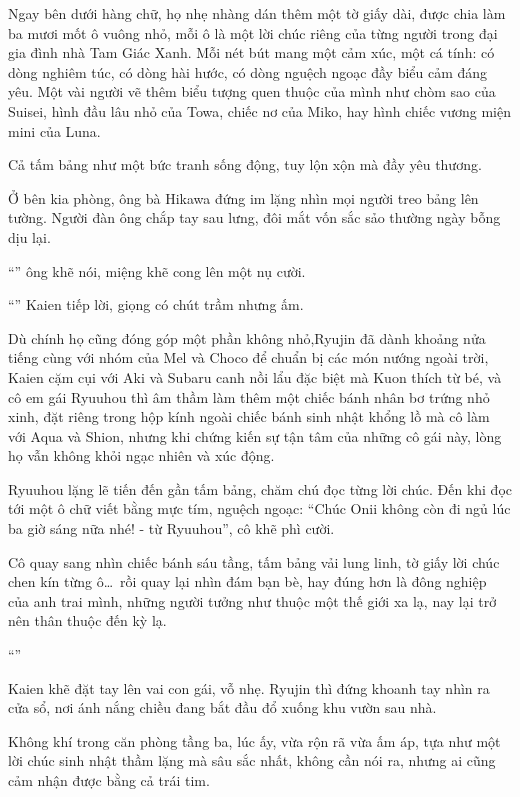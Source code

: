 \documentclass[../main.tex]{subfiles}
\begin{document}
Ngay bên dưới hàng chữ, họ nhẹ nhàng dán thêm một tờ giấy dài, được chia làm ba mươi mốt ô vuông nhỏ, mỗi ô là một lời chúc riêng của từng người trong đại gia đình nhà Tam Giác Xanh. Mỗi nét bút mang một cảm xúc, một cá tính: có dòng nghiêm túc, có dòng hài hước, có dòng nguệch ngoạc đầy biểu cảm đáng yêu. Một vài người vẽ thêm biểu tượng quen thuộc của mình như chòm sao của Suisei, hình đầu lâu nhỏ của Towa, chiếc nơ của Miko, hay hình chiếc vương miện mini của Luna.

Cả tấm bảng như một bức tranh sống động, tuy lộn xộn mà đầy yêu thương.

Ở bên kia phòng, ông bà Hikawa đứng im lặng nhìn mọi người treo bảng lên tường. Người đàn ông chắp tay sau lưng, đôi mắt vốn sắc sảo thường ngày bỗng dịu lại.

``'' ông khẽ nói, miệng khẽ cong lên một nụ cười.

``'' Kaien tiếp lời, giọng có chút trầm nhưng ấm.

Dù chính họ cũng đóng góp một phần không nhỏ,Ryujin đã dành khoảng nửa tiếng cùng với nhóm của Mel và Choco để chuẩn bị các món nướng ngoài trời, Kaien cặm cụi với Aki và Subaru canh nồi lẩu đặc biệt mà Kuon thích từ bé, và cô em gái Ryuuhou thì âm thầm làm thêm một chiếc bánh nhân bơ trứng nhỏ xinh, đặt riêng trong hộp kính ngoài chiếc bánh sinh nhật khổng lồ mà cô làm với Aqua và Shion, nhưng khi chứng kiến sự tận tâm của những cô gái này, lòng họ vẫn không khỏi ngạc nhiên và xúc động.

Ryuuhou lặng lẽ tiến đến gần tấm bảng, chăm chú đọc từng lời chúc. Đến khi đọc tới một ô chữ viết bằng mực tím, nguệch ngoạc: ``Chúc Onii không còn đi ngủ lúc ba giờ sáng nữa nhé! - từ Ryuuhou'', cô khẽ phì cười.

Cô quay sang nhìn chiếc bánh sáu tầng, tấm bảng vải lung linh, tờ giấy lời chúc chen kín từng ô\dots\ rồi quay lại nhìn đám bạn bè, hay đúng hơn là đông nghiệp của anh trai mình, những người tưởng như thuộc một thế giới xa lạ, nay lại trở nên thân thuộc đến kỳ lạ.

``''

Kaien khẽ đặt tay lên vai con gái, vỗ nhẹ. Ryujin thì đứng khoanh tay nhìn ra cửa sổ, nơi ánh nắng chiều đang bắt đầu đổ xuống khu vườn sau nhà.

Không khí trong căn phòng tầng ba, lúc ấy, vừa rộn rã vừa ấm áp, tựa như một lời chúc sinh nhật thầm lặng mà sâu sắc nhất, không cần nói ra, nhưng ai cũng cảm nhận được bằng cả trái tim.
\end{document}
